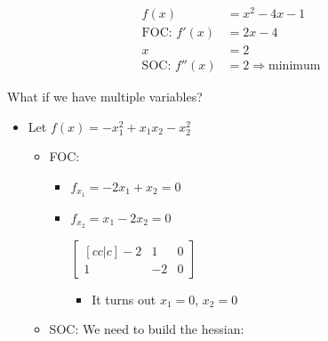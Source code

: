 \begin{align*}
    f(x) & = x^2 - 4x -1 \\
    \text{FOC: } f'(x) & = 2x -4 \\
    x & = 2 \\
    \text{SOC: } f''(x) & = 2 \Rightarrow \text{minimum}
\end{align*}

\noindent What if we have multiple variables?

\begin{itemize}
    \item Let $f(x) = -x_1^2 + x_1x_2 - x_2^2$ 
    \begin{itemize}
        \item FOC: 
        \begin{itemize}
            \item $f_{x_1} = -2x_1 + x_2 = 0$
            \item $f_{x_2} = x_1 - 2x_2 = 0$ 
            
            \vspace{1em}
            $\begin{bmatrix}[cc|c]
                    -2 & 1 & 0 \\
                    1 & -2 & 0
            \end{bmatrix}$
            \vspace{1em}

            \begin{itemize}
                \item It turns out $x_1 = 0$, $x_2 = 0$
            \end{itemize} 
        \end{itemize} 
        \item SOC: We need to build the hessian:
        

\end{itemize}
\end{itemize}
